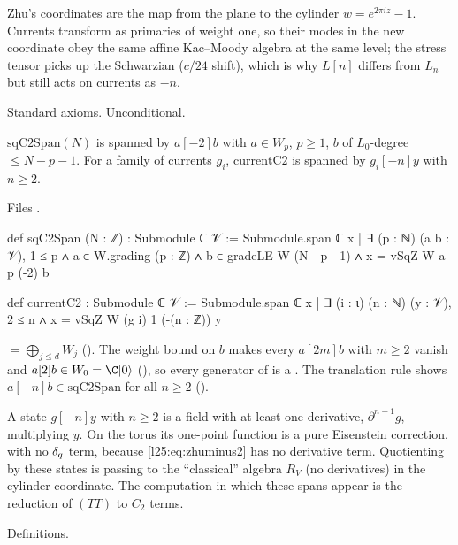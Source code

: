 \begin{physics}
Zhu's coordinates are the map from the plane to the cylinder $w=e^{2\pi i z}-1$. Currents transform as primaries of
weight one, so their modes in the new coordinate obey the same affine Kac--Moody algebra at the same level; the
stress tensor picks up the Schwarzian ($c/24$ shift), which is why $L[n]$ differs from $L_n$ but still acts on
currents as $-n$.
\end{physics}
\begin{status}
Standard axioms. Unconditional.
\end{status}

\begin{definition}\label{l25:def:spans}
$\mathrm{sqC2Span}(N)$ is spanned by $a[-2]b$ with $a\in W_p$, $p\ge1$, $b$ of $L_0$-degree $\le N-p-1$.
For a family of currents $g_i$, $\mathrm{currentC2}$ is spanned by $g_i[-n]y$ with $n\ge2$.
\end{definition}
\noindent Files .
\begin{leancode}
def sqC2Span (N : ℤ) : Submodule ℂ 𝒱 :=
  Submodule.span ℂ {x | ∃ (p : ℕ) (a b : 𝒱), 1 ≤ p ∧ a ∈ W.grading (p : ℤ) ∧
    b ∈ gradeLE W (N - p - 1) ∧ x = vSqZ W a p (-2) b}

def currentC2 : Submodule ℂ 𝒱 :=
  Submodule.span ℂ {x | ∃ (i : ι) (n : ℕ) (y : 𝒱), 2 ≤ n ∧ x = vSqZ W (g i) 1 (-(n : ℤ)) y}
\end{leancode}
\begin{dictionary}
 $=\bigoplus_{j\le d}W_j$ (). The weight bound on $b$ makes every
$a[2m]b$ with $m\ge2$ vanish and $a[2]b\in W_0=\C\ltwentyfivevac$ (), so every generator of
 is a . The translation rule shows $a[-n]b\in\mathrm{sqC2Span}$ for all $n\ge2$
().
\end{dictionary}
\begin{physics}
A state $g[-n]y$ with $n\ge2$ is a field with at least one derivative, $\partial^{n-1}g$, multiplying $y$. On
the torus its one-point function is a pure Eisenstein correction, with no $\delta_q$ term, because
\eqref{l25:eq:zhuminus2} has no derivative term. Quotienting by these states is passing to the ``classical'' algebra
$R_V$ (no derivatives) in the cylinder coordinate. The computation in which these spans appear is the reduction of
$(TT)$ to $C_2$ terms.
\end{physics}
\begin{status}
Definitions.
\end{status}


